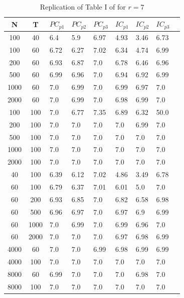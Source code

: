 \documentclass[11pt]{article}
\begin{document}
\label{bai ng information criteria}
\begin{table}[h!]
\caption{Replication of Table I of \citet{bai2002determining} for $r=7$}
 \\

\center

\begin{tabular}{cc|lllllll}

	N & T & $PC_{p1}$ & $PC_{p2}$ & $PC_{p3}$ & $IC_{p1}$ & $IC_{p2}$ & $IC_{p3}$\\
	\hline
		100 & 40 & 6.4 & 5.9 & 6.97 & 4.93 & 3.46 & 6.73 & \\ 
		100 & 60 & 6.72 & 6.27 & 7.02 & 6.34 & 4.74 & 6.99 & \\ 
		200 & 60 & 6.93 & 6.87 & 7.0 & 6.78 & 6.46 & 6.96 & \\ 
		500 & 60 & 6.99 & 6.96 & 7.0 & 6.94 & 6.92 & 6.99 & \\ 
		1000 & 60 & 7.0 & 6.99 & 7.0 & 6.99 & 6.97 & 7.0 & \\ 
		2000 & 60 & 7.0 & 6.99 & 7.0 & 6.98 & 6.99 & 7.0 & \\ 
		100 & 100 & 7.0 & 6.77 & 7.35 & 6.89 & 6.32 & 50.0 & \\ 
		200 & 100 & 7.0 & 7.0 & 7.0 & 7.0 & 6.99 & 7.0 & \\ 
		500 & 100 & 7.0 & 7.0 & 7.0 & 7.0 & 7.0 & 7.0 & \\ 
		1000 & 100 & 7.0 & 7.0 & 7.0 & 7.0 & 7.0 & 7.0 & \\ 
		2000 & 100 & 7.0 & 7.0 & 7.0 & 7.0 & 7.0 & 7.0 & \\ 
		40 & 100 & 6.39 & 6.12 & 7.02 & 4.86 & 3.49 & 6.78 & \\ 
		60 & 100 & 6.79 & 6.37 & 7.01 & 6.01 & 5.0 & 7.0 & \\ 
		60 & 200 & 6.93 & 6.85 & 7.0 & 6.82 & 6.58 & 6.98 & \\ 
		60 & 500 & 6.96 & 6.97 & 7.0 & 6.97 & 6.9 & 6.99 & \\ 
		60 & 1000 & 7.0 & 6.99 & 7.0 & 6.99 & 6.96 & 7.0 & \\ 
		60 & 2000 & 7.0 & 7.0 & 7.0 & 6.97 & 6.98 & 6.99 & \\ 
		4000 & 60 & 7.0 & 7.0 & 6.99 & 6.98 & 6.99 & 6.99 & \\ 
		4000 & 100 & 7.0 & 7.0 & 7.0 & 7.0 & 7.0 & 7.0 & \\ 
		8000 & 60 & 6.99 & 7.0 & 7.0 & 7.0 & 6.98 & 7.0 & \\ 
		8000 & 100 & 7.0 & 7.0 & 7.0 & 7.0 & 7.0 & 7.0 & \\ 

\end{tabular}
\end{table}
\end{document}
